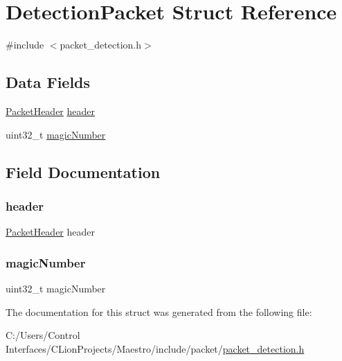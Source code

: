 \hypertarget{struct_detection_packet}{}\section{Detection\+Packet Struct Reference}
\label{struct_detection_packet}


{\ttfamily \#include $<$packet\+\_\+detection.\+h$>$}

\subsection*{Data Fields}
\begin{DoxyCompactItemize}
\item 
\hyperlink{struct_packet_header}{Packet\+Header} \hyperlink{struct_detection_packet_aaed6c168c58cb4f203b7f5623775d739}{header}
\item 
uint32\+\_\+t \hyperlink{struct_detection_packet_a3081fb3d81f6a8484b9451a66e4d1dba}{magic\+Number}
\end{DoxyCompactItemize}


\subsection{Field Documentation}
\mbox{\label{struct_detection_packet_aaed6c168c58cb4f203b7f5623775d739}} 
\subsubsection{\texorpdfstring{header}{header}}
{\footnotesize\ttfamily \hyperlink{struct_packet_header}{Packet\+Header} header}

\mbox{\label{struct_detection_packet_a3081fb3d81f6a8484b9451a66e4d1dba}} 
\subsubsection{\texorpdfstring{magic\+Number}{magicNumber}}
{\footnotesize\ttfamily uint32\+\_\+t magic\+Number}



The documentation for this struct was generated from the following file\+:\begin{DoxyCompactItemize}
\item 
C\+:/\+Users/\+Control Interfaces/\+C\+Lion\+Projects/\+Maestro/include/packet/\hyperlink{packet__detection_8h}{packet\+\_\+detection.\+h}\end{DoxyCompactItemize}
